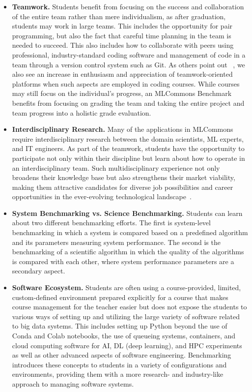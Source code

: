 \begin{itemize}


\item {\bf Teamwork.} Students benefit from focusing on the success and collaboration of the entire team rather than mere individualism, as after graduation, students may work in large teams. This includes the opportunity for pair programming, but also the fact that careful time planning in the team is needed to succeed. This also includes how to collaborate with peers using professional, industry-standard coding software and management of code in a team through a version control system such as Git. As others point out ~\cite{raibulet}, we also see an increase in enthusiasm and appreciation of teamwork-oriented platforms when such aspects are employed in coding courses. While courses may still focus on the individual's progress, an MLCommons Benchmark benefits from focusing on grading the team and taking the entire project and team progress into a holistic grade evaluation. 

\item {\bf Interdisciplinary Research.} Many of the applications in MLCommons require interdisciplinary research between the domain scientists, ML experts, and IT engineers. As part of the teamwork, students have the opportunity to participate not only within their discipline but learn about how to operate in an interdisciplinary team. Such multidisciplinary experience not only broadens their knowledge base but also strengthens their market viability, making them attractive candidates for diverse job possibilities and career opportunities in the ever-evolving technological landscape~\cite{zeidmane}.

\item {\bf System Benchmarking vs. Science Benchmarking.} Students can learn about two different benchmarking efforts. The first is system-level benchmarking in which a system is compared based on a predefined algorithm and its parameters measuring system performance. The second is the benchmarking of a scientific algorithm in which the quality of the algorithms is compared with each other, where system performance parameters are a secondary aspect.

\item {\bf Software Ecosystem.} Students are often using a course-provided, limited, custom-defined environment prepared explicitly for a course that makes course management for the teacher easier but does not expose the students to various ways of setting up and utilizing the large variety of software related to big data systems. This includes setting up Python beyond the use of Conda and Colab notebooks, the use of queueing systems, containers, and cloud computing software for AI, DL (deep learning), and HPC experiments as well as other advanced aspects of software engineering. Benchmarking introduces these concepts to students in a variety of configurations and environments, providing them with a more research- and industry-like approach to managing software systems.


\end{itemize}

